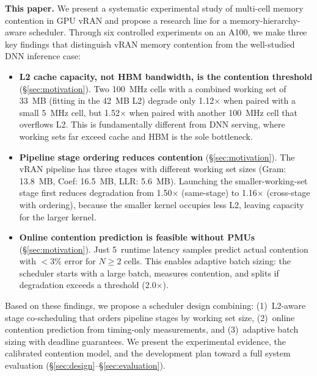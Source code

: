 \textbf{This paper.} We present a systematic experimental study of multi-cell memory contention in GPU vRAN and propose a research line for a memory-hierarchy-aware scheduler. Through six controlled experiments on an A100, we make three key findings that distinguish vRAN memory contention from the well-studied DNN inference case:

\begin{itemize}[leftmargin=*,nosep]
\item \textbf{L2 cache capacity, not HBM bandwidth, is the contention threshold} (\S\ref{sec:motivation}). Two 100~MHz cells with a combined working set of 33~MB (fitting in the 42~MB L2) degrade only 1.12$\times$ when paired with a small 5~MHz cell, but 1.52$\times$ when paired with another 100~MHz cell that overflows L2. This is fundamentally different from DNN serving, where working sets far exceed cache and HBM is the sole bottleneck.

\item \textbf{Pipeline stage ordering reduces contention} (\S\ref{sec:motivation}). The vRAN pipeline has three stages with different working set sizes (Gram: 13.8~MB, Coef: 16.5~MB, LLR: 5.6~MB). Launching the smaller-working-set stage first reduces degradation from 1.50$\times$ (same-stage) to 1.16$\times$ (cross-stage with ordering), because the smaller kernel occupies less L2, leaving capacity for the larger kernel.

\item \textbf{Online contention prediction is feasible without PMUs} (\S\ref{sec:motivation}). Just 5~runtime latency samples predict actual contention with $<$3\% error for $N \geq 2$ cells. This enables adaptive batch sizing: the scheduler starts with a large batch, measures contention, and splits if degradation exceeds a threshold (2.0$\times$).
\end{itemize}

Based on these findings, we propose a scheduler design combining: (1)~L2-aware stage co-scheduling that orders pipeline stages by working set size, (2)~online contention prediction from timing-only measurements, and (3)~adaptive batch sizing with deadline guarantees. We present the experimental evidence, the calibrated contention model, and the development plan toward a full system evaluation (\S\ref{sec:design}--\S\ref{sec:evaluation}).
